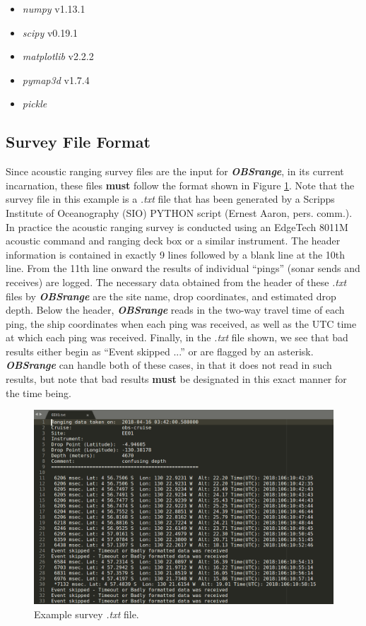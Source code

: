 \documentclass[titlepage, 12pt]{article}
\begin{document}
  \begin{itemize}
   \item \textit{numpy} v1.13.1
   \item \textit{scipy} v0.19.1
   \item \textit{matplotlib} v2.2.2
   \item \textit{pymap3d} v1.7.4
   \item \textit{pickle}
  \end{itemize}

  \subsection{Survey File Format}
  Since acoustic ranging survey files are the input for \textit{\textbf{OBSrange}}, in its current incarnation, these files \textbf{must} follow the format shown in Figure \ref{fig:surveyfle}. Note that the survey file in this example is a \textit{.txt} file that has been generated by a Scripps Institute of Oceanography (SIO) PYTHON script (Ernest Aaron, pers. comm.). In practice the acoustic ranging survey is conducted using an EdgeTech 8011M acoustic command and ranging deck box or a similar instrument. The header information is contained in exactly 9 lines followed by a blank line at the 10th line. From the 11th line onward the results of individual “pings” (sonar sends and receives) are logged. The necessary data obtained from the header of these \textit{.txt} files by \textit{\textbf{OBSrange}} are the site name, drop coordinates, and estimated drop depth. Below the header, \textit{\textbf{OBSrange}} reads in the two-way travel time of each ping, the ship coordinates when each ping was received, as well as the UTC time at which each ping was received. Finally, in the  \textit{.txt} file shown, we see that bad results either begin as ``Event skipped ...'' or are flagged by an asterisk. \textit{\textbf{OBSrange}} can handle both of these cases, in that it does not read in such results, but note that bad results \textbf{must} be designated in this exact manner for the time being.

  \begin{figure}[!htb]
   \includegraphics[width=\linewidth]{survey_fle_ex.png}
   \caption{Example survey \textit{.txt} file.}
   \label{fig:surveyfle}
  \end{figure} 
  
\end{document}
